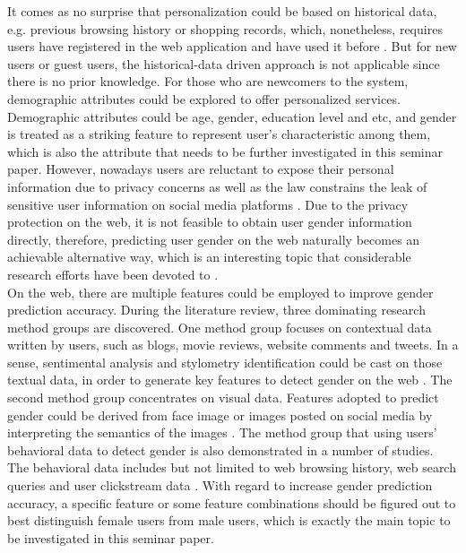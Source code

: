 \documentclass[runningheads]{llncs}
\begin{document}
	It comes as no surprise that personalization could be based on historical data, e.g. previous browsing history or shopping records, which, nonetheless, requires users have registered in the web application and have used it before \cite{duong2016customer}. But for new users or guest users, the historical-data driven approach is not applicable since there is no prior knowledge. For those who are newcomers to the system, demographic attributes could be explored to offer personalized services. Demographic attributes could be age, gender, education level and etc, and gender is treated as a striking feature to represent user’s characteristic among them, which is also the attribute that needs to be further investigated in this seminar paper. However, nowadays users are reluctant to expose their personal information due to privacy concerns as well as the law constrains the leak of sensitive user information on social media platforms \cite{zheleva2009join}. Due to the privacy protection on the web, it is not feasible to obtain user gender information directly, therefore, predicting user gender on the web naturally becomes an achievable alternative way, which is an interesting topic that considerable research efforts have been devoted to \cite{phuong2014gender}. \\
	
	On the web, there are multiple features could be employed to improve gender prediction accuracy. During the literature review, three dominating research method groups are discovered. One method group focuses on contextual data written by users, such as blogs, movie reviews, website comments and tweets.  In a sense, sentimental analysis and stylometry identification could be cast on those textual data, in order to generate key features to detect gender on the web \cite{phuong2014gender}. The second method group concentrates on visual data. Features adopted to predict gender could be derived from face image or images posted on social media by interpreting the semantics of the images \cite{merler2015you}. The method group that using users’ behavioral data to detect gender is also demonstrated in a number of studies. The behavioral data includes but not limited to web browsing history, web search queries and user clickstream data \cite{hu2007demographic}. With regard to increase gender prediction accuracy, a specific feature or some feature combinations should be figured out to best distinguish female users from male users, which is exactly the main topic to be investigated in this seminar paper. \\
	
\end{document}
